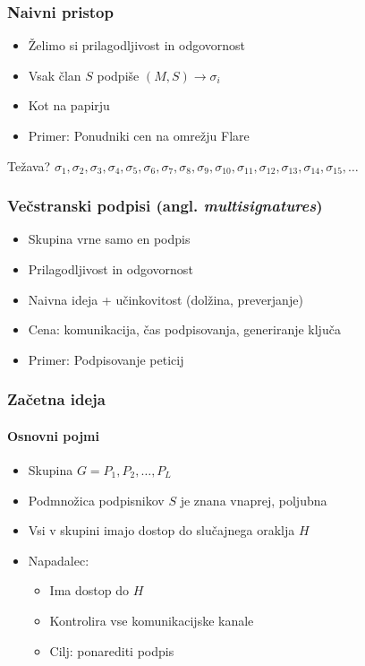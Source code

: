 \documentclass{beamer}    %
\begin{document}
\begin{frame}
    \frametitle{Naivni pristop}
    \begin{itemize}
        \item Želimo si prilagodljivost in odgovornost
        \item Vsak član $S$ podpiše $(M, S) \rightarrow \sigma_i$
        \item Kot na papirju
        \item Primer: Ponudniki cen na omrežju Flare 
    \end{itemize}
    \vspace{1cm}
    Težava?
        $\sigma_1, \sigma_2, \sigma_3, \sigma_4, \sigma_5, \sigma_6,
        \sigma_7,  \sigma_8, \sigma_9, \sigma_{10}, \sigma_{11}, \sigma_{12}, 
        \sigma_{13}, \sigma_{14}, \sigma_{15}, \dots$
\end{frame}

\begin{frame}
    \frametitle{Večstranski podpisi (angl. \textit{multisignatures})}
    \begin{itemize}
        \item Skupina vrne samo en podpis
        \item Prilagodljivost in odgovornost
        \item Naivna ideja + učinkovitost (dolžina, preverjanje)
        \item Cena: komunikacija, čas podpisovanja, generiranje ključa
        \item Primer: Podpisovanje peticij
    \end{itemize}
\end{frame}

\begin{frame}
    \frametitle{Začetna ideja}
    \framesubtitle{Osnovni pojmi}
    \begin{itemize}
        \item Skupina $G = P_1, P_2, \dots, P_L$
        \item Podmnožica podpisnikov $S$ je znana vnaprej, poljubna
        \item Vsi v skupini imajo dostop do slučajnega oraklja $H$
        \item Napadalec: 
            \begin{itemize}
                \item Ima dostop do $H$
                \item Kontrolira vse komunikacijske kanale
                \item Cilj: ponarediti podpis
            \end{itemize}
    \end{itemize}
\end{frame}
\end{document}

